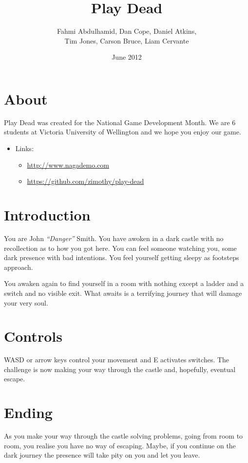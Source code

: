 \documentclass{article}
\title{Play Dead}
\author{Fahmi Abdulhamid, Dan Cope, Daniel Atkins,\\Tim Jones, Carson Bruce, Liam Cervante}
\date{June 2012}
\begin{document}
 \maketitle
 
 \section{About}Play Dead was created for the National Game Development Month. We are 6 students at Victoria University of Wellington and we hope you enjoy our game.
 \begin{itemize}
  \item Links:
  \begin{itemize}
   \item \url{http://www.nagademo.com}
   \item \url{https://github.com/zimothy/play-dead}
  \end{itemize}
 \end{itemize}
 
 \section{Introduction}
 
 You are John \emph{``Danger''} Smith. You have awoken in a dark castle with no recollection as to how you got here. You can feel someone watching you, some dark presence with bad intentions. You feel yourself getting sleepy as footsteps approach.
 
 You awaken again to find yourself in a room with nothing except a ladder and a switch and no visible exit. What awaits is a terrifying journey that will damage your very soul.
 
 \section{Controls}
 
 WASD or arrow keys control your movement and E activates switches. The challenge is now making your way through the castle and, hopefully, eventual escape.
 
 \section{Ending}
 
 As you make your way through the castle solving problems, going from room to room, you realise you have no way of escaping. Maybe, if you continue on the dark journey the presence will take pity on you and let you leave.
 
\end{document}
